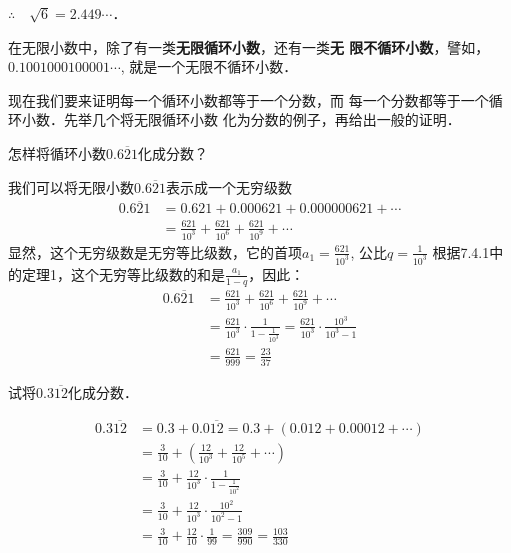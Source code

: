 $\therefore\quad \sqrt{6}=2.449\cdots$．

在无限小数中，除了有一类\textbf{无限循环小数}，还有一类\textbf{无
限不循环小数}，譬如，$0.1001000100001\cdots$,
就是一个无限不循环小数．

现在我们要来证明每一个循环小数都等于一个分数，而
每一个分数都等于一个循环小数．先举几个将无限循环小数
化为分数的例子，再给出一般的证明．


\begin{example}
    怎样将循环小数$0.\overline{621}$化成分数？
\end{example}

\begin{solution}
    我们可以将无限小数$0.\overline{621}$表示成一个无穷级数
\[\begin{split}
0.\overline{621}&=0.621+0.000621+0.000000621+\cdots\\
&=\frac{621}{10^3}+\frac{621}{10^6}+\frac{621}{10^9}+\cdots
\end{split}\]
显然，这个无穷级数是无穷等比级数，它的首项$a_1=\frac{621}{10^3}$, 公比$q=\frac{1}{10^3}$
根据7.4.1中的定理1，这个无穷等比级数的和是$\frac{a_1}{1-q}$，因此：
\[\begin{split}
    0.\overline{621}&=\frac{621}{10^3}+\frac{621}{10^6}+\frac{621}{10^9}+\cdots\\
    &=\frac{621}{10^3}\cdot \frac{1}{1-\frac{1}{10^3}}=\frac{621}{10^3}\cdot \frac{10^3}{10^3-1}\\
    &=\frac{621}{999}=\frac{23}{37}
\end{split}\]
\end{solution}

\begin{example}
试将$0.3\overline{12}$化成分数．
\end{example}

\begin{solution}
\[\begin{split}
    0.3\overline{12}&= 0.3+0.0\overline{12}=0.3+(0.012+0.00012+\cdots)\\
    &=\frac{3}{10}+\left(\frac{12}{10^3}+\frac{12}{10^5}+\cdots\right)\\
    &=\frac{3}{10}+\frac{12}{10^3}\cdot \frac{1}{1-\frac{1}{10^2}}\\
    &=\frac{3}{10}+\frac{12}{10^3}\cdot \frac{10^2}{10^2-1}\\
    &=\frac{3}{10}+\frac{12}{10}\cdot \frac{1}{99}=\frac{309}{990}=\frac{103}{330}
\end{split}\]
\end{solution}

